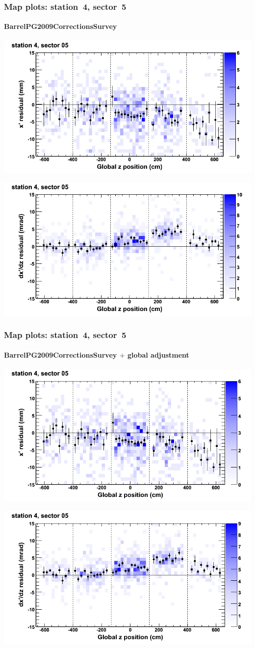 \documentclass[compress]{beamer}
\begin{document}
\begin{frame}
\frametitle{Map plots: station~4, sector~5}
\framesubtitle{BarrelPG2009CorrectionsSurvey}
\includegraphics[width=0.5\linewidth]{mapplots_01/DTvsz_st4sec05_x.png}

\includegraphics[width=0.5\linewidth]{mapplots_01/DTvsz_st4sec05_dxdz.png}
\end{frame}
\begin{frame}
\frametitle{Map plots: station~4, sector~5}
\framesubtitle{BarrelPG2009CorrectionsSurvey $+$ global adjustment}
\includegraphics[width=0.5\linewidth]{mapplots_re01/DTvsz_st4sec05_x.png}

\includegraphics[width=0.5\linewidth]{mapplots_re01/DTvsz_st4sec05_dxdz.png}
\end{frame}
\end{document}
